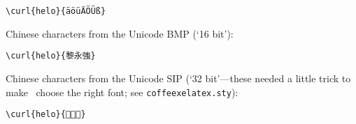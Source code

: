 \begin{verbatim}
\curl{helo}{äöüÄÖÜß}
\end{verbatim}


Chinese characters from the Unicode BMP (`16 bit'):

\begin{verbatim}
\curl{helo}{黎永強}
\end{verbatim}


Chinese characters from the Unicode SIP (`32 bit'---these needed a little trick to make \XeLaTeX\ choose
the right font; see \verb#coffeexelatex.sty#):

\begin{verbatim}
\curl{helo}{𠀀𠀐𠀙}
\end{verbatim}








